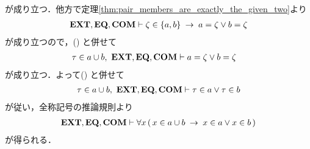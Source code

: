 \begin{sketch}
\begin{description}
				が成り立つ．他方で定理\ref{thm:pair_members_are_exactly_the_given_two}より
				\begin{align}
					\mbox{{\bf EXT}},\mbox{{\bf EQ}},\mbox{\bf COM} \vdash
					\zeta \in \{a,b\} \hspace{0.25em}\rightarrow\hspace{0.25em} a = \zeta \vee b = \zeta
				\end{align}
				が成り立つので，()
				と併せて
				\begin{align}
					\tau \in a \cup b,\ \mbox{{\bf EXT}},\mbox{{\bf EQ}},\mbox{\bf COM} &\vdash 
					a = \zeta \vee b = \zeta
				\end{align}
				が成り立つ．よって()
				と併せて
				\begin{align}
					\tau \in a \cup b,\ \mbox{{\bf EXT}},\mbox{{\bf EQ}},\mbox{\bf COM} \vdash 
					\tau \in a \vee \tau \in b
				\end{align}
				が従い，全称記号の推論規則より
				\begin{align}
					\mbox{{\bf EXT}},\mbox{{\bf EQ}},\mbox{\bf COM} \vdash 
					\forall x\, (\, x \in a \cup b \hspace{0.25em}\rightarrow\hspace{0.25em} x \in a \vee x \in b\, )
				\end{align}
				が得られる．
				

\end{description}
\end{sketch}
